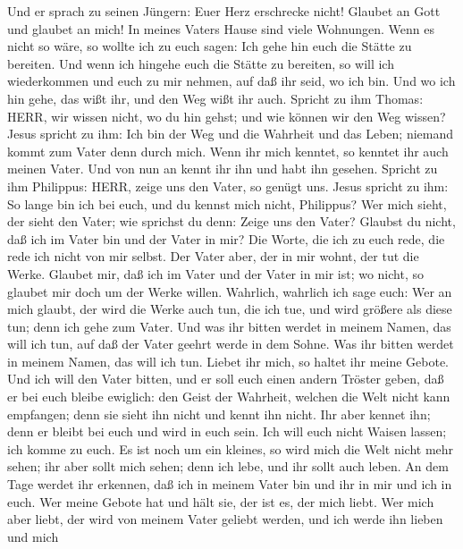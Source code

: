  Und er sprach zu seinen Jüngern: Euer Herz erschrecke
nicht! Glaubet an Gott und glaubet an mich!  In meines
Vaters Hause sind viele Wohnungen. Wenn es nicht so wäre, so wollte ich
zu euch sagen: Ich gehe hin euch die Stätte zu bereiten. 
Und wenn ich hingehe euch die Stätte zu bereiten, so will ich
wiederkommen und euch zu mir nehmen, auf daß ihr seid, wo ich bin.
 Und wo ich hin gehe, das wißt ihr, und den Weg wißt ihr
auch.  Spricht zu ihm Thomas: HERR, wir wissen nicht, wo du
hin gehst; und wie können wir den Weg wissen?  Jesus spricht
zu ihm: Ich bin der Weg und die Wahrheit und das Leben; niemand kommt
zum Vater denn durch mich.  Wenn ihr mich kenntet, so
kenntet ihr auch meinen Vater. Und von nun an kennt ihr ihn und habt ihn
gesehen.  Spricht zu ihm Philippus: HERR, zeige uns den
Vater, so genügt uns.  Jesus spricht zu ihm: So lange bin
ich bei euch, und du kennst mich nicht, Philippus? Wer mich sieht, der
sieht den Vater; wie sprichst du denn: Zeige uns den Vater?
 Glaubst du nicht, daß ich im Vater bin und der Vater in
mir? Die Worte, die ich zu euch rede, die rede ich nicht von mir selbst.
Der Vater aber, der in mir wohnt, der tut die Werke. 
Glaubet mir, daß ich im Vater und der Vater in mir ist; wo nicht, so
glaubet mir doch um der Werke willen.  Wahrlich, wahrlich
ich sage euch: Wer an mich glaubt, der wird die Werke auch tun, die ich
tue, und wird größere als diese tun; denn ich gehe zum Vater.
 Und was ihr bitten werdet in meinem Namen, das will ich
tun, auf daß der Vater geehrt werde in dem Sohne.  Was ihr
bitten werdet in meinem Namen, das will ich tun.  Liebet
ihr mich, so haltet ihr meine Gebote.  Und ich will den
Vater bitten, und er soll euch einen andern Tröster geben, daß er bei
euch bleibe ewiglich:  den Geist der Wahrheit, welchen die
Welt nicht kann empfangen; denn sie sieht ihn nicht und kennt ihn nicht.
Ihr aber kennet ihn; denn er bleibt bei euch und wird in euch sein.
 Ich will euch nicht Waisen lassen; ich komme zu euch.
 Es ist noch um ein kleines, so wird mich die Welt nicht
mehr sehen; ihr aber sollt mich sehen; denn ich lebe, und ihr sollt auch
leben.  An dem Tage werdet ihr erkennen, daß ich in meinem
Vater bin und ihr in mir und ich in euch.  Wer meine Gebote
hat und hält sie, der ist es, der mich liebt. Wer mich aber liebt, der
wird von meinem Vater geliebt werden, und ich werde ihn lieben und mich
